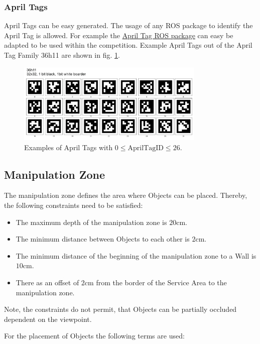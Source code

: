 \subsubsection{April Tags}
April Tags can be easy generated. The usage of any ROS package to identify the April Tag is allowed. For example the \href{http://wiki.ros.org/apriltag_ros}{April Tag ROS package} can easy be adapted to be used within the competition. Example April Tags out of the April Tag Family  36h11 are shown in fig. \ref{fig:AprilTagExamples}. 


\begin{figure}[h!]
	\centering
	\includegraphics[width= 0.8\textwidth ]{./images/AprilTags/apriltags0to26.png}
	\caption{Examples of April Tags with $0 \le \mathrm{April Tag ID} \le 26$.}
	\label{fig:AprilTagExamples}
\end{figure}




\subsection{Manipulation Zone} \label{ssec:ManipulationZone}
The manipulation zone defines the area where Objects can be placed. Thereby, the following constraints need to be satisfied:
\begin{itemize}
	\item The maximum depth of the manipulation zone is $20\si{\centi\meter}$.
	\item The minimum distance between Objects to each other is $2\si{\centi\meter}$.
	\item The minimum distance of the beginning of the manipulation zone to a Wall is $10\si{\centi\meter}$.
	\item There as an offset of $2\si{\centi\meter}$ from the border of the Service Area to the manipulation zone.
\end{itemize}
Note, the constraints do not permit, that Objects can be partially occluded dependent on the viewpoint.

For the placement of Objects the following terms are used:

